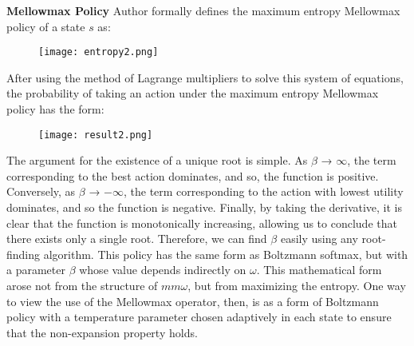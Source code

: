\textbf{Mellowmax Policy}
\newline\newline
Author formally defines the maximum entropy Mellowmax policy of a state $s$ as:

\begin{figure}[htbp]
\centering
\texttt{[image: entropy2.png]}
\end{figure}

After using the method of Lagrange multipliers to solve this system of equations, the probability of taking an action under the maximum entropy Mellowmax policy has the form:

\begin{figure}[htbp]
\centering
\texttt{[image: result2.png]}
\end{figure}

The argument for the existence of a unique root is simple. As $\beta$ → $\infty$, the term corresponding to the best action dominates, and so, the function is positive. Conversely, as $\beta$ → $-\infty$, the term corresponding to the action with lowest utility dominates, and so the function is negative. Finally, by taking the derivative, it is clear that the function is monotonically increasing, allowing us to conclude that there exists only a single root. Therefore, we can find $\beta$ easily using any root-finding algorithm. 
\newline\newline
This policy has the same form as Boltzmann softmax, but with a parameter $\beta$ whose value depends indirectly on $\omega$. This mathematical form arose not from the structure of $mm\omega$, but from maximizing the entropy. One way to view the use of the Mellowmax operator, then, is as a form of Boltzmann policy with a temperature parameter chosen adaptively in each state to ensure that the non-expansion property holds.
